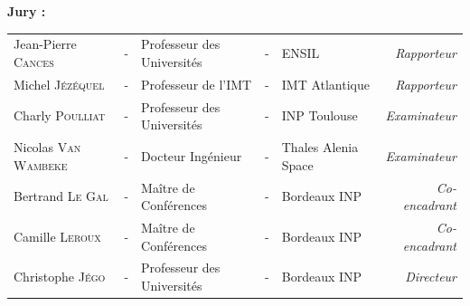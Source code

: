 \documentclass[a4paper, 11pt]{article}
\begin{document}
          \noindent \large \textbf{Jury :} \\
          \vspace*{-1.5em}
          \begin{center}
            \begin{tabular}{lclclr}
              Jean-Pierre \textsc{Cances}  &-& Professeur des Universités & - & ENSIL                & \textit{Rapporteur}   \\
              Michel \textsc{Jézéquel}     & - & Professeur de l'IMT & - & IMT Atlantique                & \textit{Rapporteur}   \\
              Charly \textsc{Poulliat}          & - & Professeur des Universités                      & - & INP Toulouse        & \textit{Examinateur}   \\
              Nicolas \textsc{Van Wambeke} & - & Docteur Ingénieur                  & - & Thales Alenia Space & \textit{Examinateur}  \\
              Bertrand \textsc{Le Gal}     & - & Maître de Conférences      & - & Bordeaux INP        & \textit{Co-encadrant} \\
              Camille \textsc{Leroux}      & - & Maître de Conférences      & - & Bordeaux INP        & \textit{Co-encadrant} \\
              Christophe \textsc{Jégo}     & - & Professeur des Universités & - & Bordeaux INP        & \textit{Directeur}    \\
            \end{tabular}
          \end{center}
          
          
          
        
\end{document}
